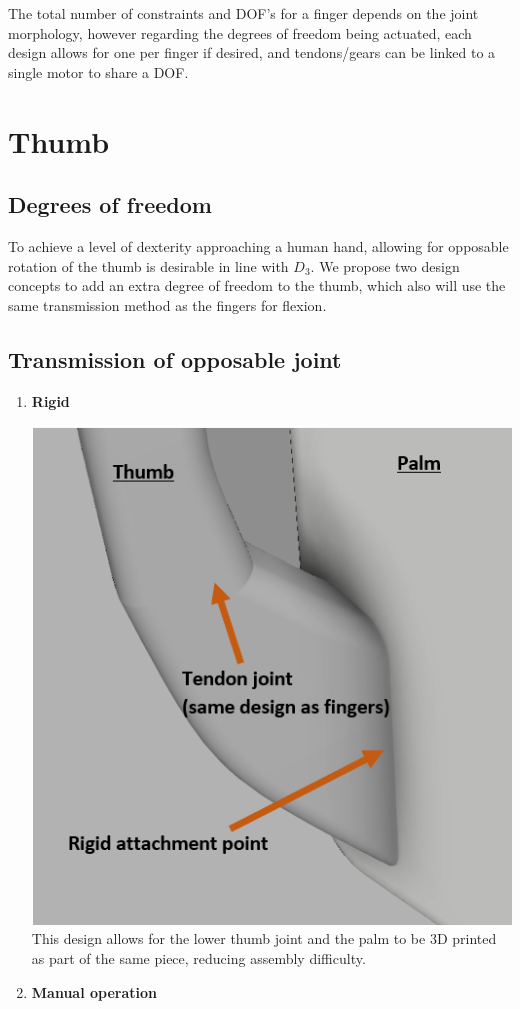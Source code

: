 \documentclass[11pt,3p]{report}
\begin{document}
\begin{multicols}{2}
		The total number of constraints and DOF's for a finger depends on the joint morphology, however regarding the degrees of freedom being actuated, each design allows for one per finger if desired, and tendons/gears can be linked to a single motor to share a DOF.

	\section{Thumb}
	
		\subsection{Degrees of freedom}
To achieve a level of dexterity approaching a human hand, allowing for opposable rotation of the thumb is desirable in line with $D_3$. We propose two design concepts to add an extra degree of freedom to the thumb, which also will use the same transmission method as the fingers for flexion. 

		
		\subsection{Transmission of opposable joint}
			\begin{enumerate}[noitemsep]
			\item \textbf{Rigid} {
			
			\includegraphics[scale=0.55]{rigid_thumb.PNG}
						This design allows for the lower thumb joint and the palm to be 3D printed as part of the same piece, reducing assembly difficulty.
			}
\vfill\null
			\columnbreak
			\item \textbf{Manual operation} {
				
}
\end{enumerate}
\end{multicols}
\end{document}
